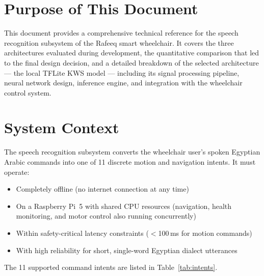 \documentclass[12pt, a4paper]{report}
\begin{document}
\section{Purpose of This Document}

This document provides a comprehensive technical reference for the speech recognition
subsystem of the Rafeeq smart wheelchair. It covers the three architectures evaluated
during development, the quantitative comparison that led to the final design decision,
and a detailed breakdown of the selected architecture --- the local TFLite KWS model ---
including its signal processing pipeline, neural network design, inference engine, and
integration with the wheelchair control system.

\section{System Context}

The speech recognition subsystem converts the wheelchair user's spoken Egyptian Arabic
commands into one of 11 discrete motion and navigation intents. It must operate:

\begin{itemize}[noitemsep]
  \item Completely offline (no internet connection at any time)
  \item On a Raspberry Pi~5 with shared CPU resources (navigation, health monitoring,
        and motor control also running concurrently)
  \item Within safety-critical latency constraints ($<$100\,ms for motion commands)
  \item With high reliability for short, single-word Egyptian dialect utterances
\end{itemize}

The 11 supported command intents are listed in Table~\ref{tab:intents}.
\end{document}
